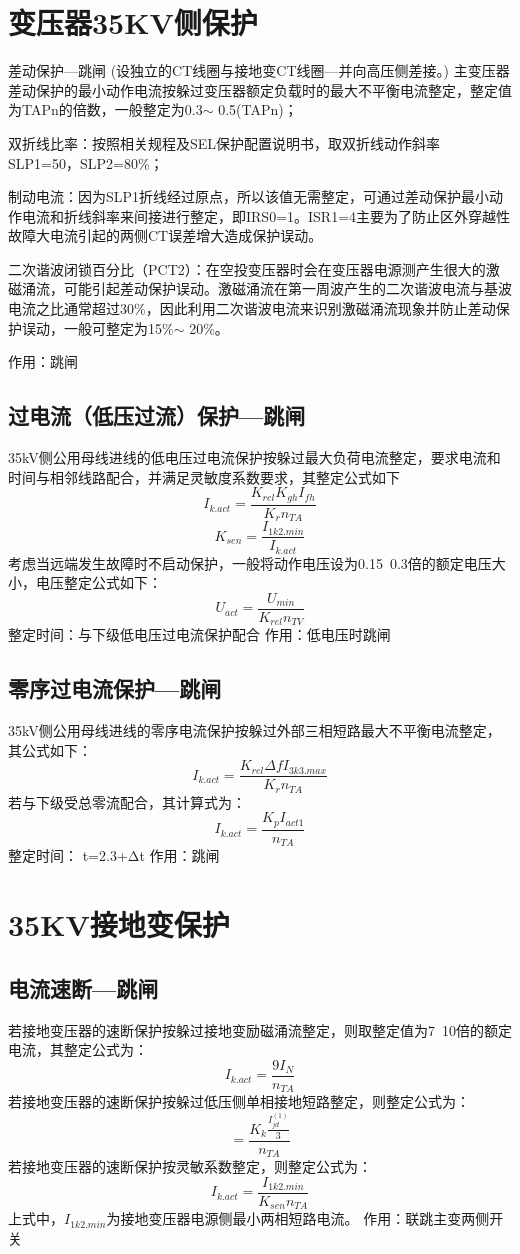 \section{变压器35KV侧保护}
差动保护---跳闸
(设独立的CT线圈与接地变CT线圈---并向高压侧差接。)
主变压器差动保护的最小动作电流按躲过变压器额定负载时的最大不平衡电流整定，整定值为TAPn的倍数，一般整定为0.3$ \sim $ 0.5(TAPn)；\par 
双折线比率：按照相关规程及SEL保护配置说明书，取双折线动作斜率SLP1=50，SLP2=80\%；\par 
制动电流：因为SLP1折线经过原点，所以该值无需整定，可通过差动保护最小动作电流和折线斜率来间接进行整定，即IRS0=1。ISR1=4主要为了防止区外穿越性故障大电流引起的两侧CT误差增大造成保护误动。\par 
二次谐波闭锁百分比（PCT2）：在空投变压器时会在变压器电源测产生很大的激磁涌流，可能引起差动保护误动。激磁涌流在第一周波产生的二次谐波电流与基波电流之比通常超过30\%，因此利用二次谐波电流来识别激磁涌流现象并防止差动保护误动，一般可整定为15\%$ \sim $ 20\%。\par 
作用：跳闸
\subsection{过电流（低压过流）保护---跳闸}
35kV侧公用母线进线的低电压过电流保护按躲过最大负荷电流整定，要求电流和时间与相邻线路配合，并满足灵敏度系数要求，其整定公式如下
$$
I_{k.act}=\frac{K_{rel}K_{gh}I_{fh}}{K_rn_{TA}}
$$
$$
K_{sen}=\frac{I_{1k2.min}}{I_{k.act}}
$$
考虑当远端发生故障时不启动保护，一般将动作电压设为0.15~0.3倍的额定电压大小，电压整定公式如下：
$$
U_{act}=\frac{U_{min}}{K_{rel}n_{TV}}
$$
整定时间：与下级低电压过电流保护配合\newline
作用：低电压时跳闸

\subsection{零序过电流保护---跳闸}
35kV侧公用母线进线的零序电流保护按躲过外部三相短路最大不平衡电流整定，其公式如下：
$$
I_{k.act}=\frac{K_{rel}\varDelta fI_{3k3.max}}{K_rn_{TA}}
$$
若与下级受总零流配合，其计算式为：
$$
I_{k.act}=\frac{K_pI_{act1}}{n_{TA}}
$$
整定时间： t=2.3+Δt \newline
作用：跳闸

\section{35KV接地变保护}
\subsection{电流速断---跳闸}
若接地变压器的速断保护按躲过接地变励磁涌流整定，则取整定值为7~10倍的额定电流，其整定公式为：
$$
I_{k.act}=\frac{9I_N}{n_{TA}}
$$
若接地变压器的速断保护按躲过低压侧单相接地短路整定，则整定公式为：
$$
=\frac{K_k\frac{I_{jd}^{(1)}}{3}}{n_{TA}}
$$
若接地变压器的速断保护按灵敏系数整定，则整定公式为：
$$
I_{k.act}=\frac{I_{1k2.min}}{K_{sen}n_{TA}}
$$
上式中，$I_{1k2.min}$为接地变压器电源侧最小两相短路电流。\newline
作用：联跳主变两侧开关

